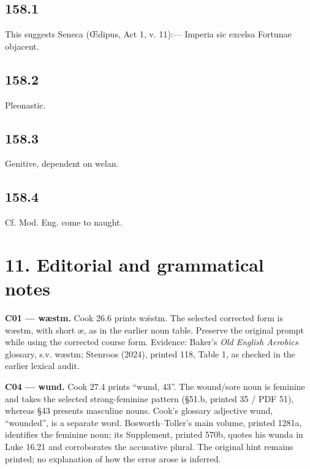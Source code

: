 \subsection*{158.1}

This suggests Seneca (Œdipus, Act 1, v. 11):— Imperia sic excelsa Fortunae objacent.

\subsection*{158.2}

Pleonastic.

\subsection*{158.3}

Genitive, dependent on welan.

\subsection*{158.4}

Cf. Mod. Eng. come to naught.

\section*{11. Editorial and grammatical notes}

\textbf{C01 — wæstm.} Cook 26.6 prints wǣstm. The selected corrected form is wæstm, with short æ, as in the earlier noun table. Preserve the original prompt while using the corrected course form. Evidence: Baker’s \emph{Old English Aerobics} glossary, s.v. wæstm; Stenroos (2024), printed 118, Table 1, as checked in the earlier lexical audit.

\textbf{C04 — wund.} Cook 27.4 prints “wund, 43”. The wound/\allowbreak{}sore noun is feminine and takes the selected strong-feminine pattern (§51.b, printed 35 /\allowbreak{} PDF 51), whereas §43 presents masculine nouns. Cook’s glossary adjective wund, “wounded”, is a separate word. Bosworth–Toller’s main volume, printed 1281a, identifies the feminine noun; its Supplement, printed 570b, quotes his wunda in Luke 16.21 and corroborates the accusative plural. The original hint remains printed; no explanation of how the error arose is inferred.

